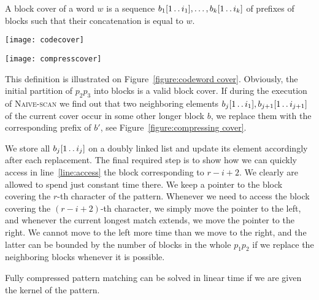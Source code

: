 \documentclass[runningheads]{llncs}
\newcommand{\twodots}{\mathinner{\ldotp\ldotp}}
\newcommand{\proc}[1]{\textnormal{\scshape#1}}
\begin{document}
\begin{definition}
A block cover of a word $w$ is a sequence $b_1[1\twodots i_1], \ldots, b_k[1\twodots i_k]$ of prefixes of blocks 
such that their concatenation is equal to $w$.
\end{definition}

\begin{figure*}
\begin{minipage}[b]{0.5\linewidth}
\centering
\texttt{[image: codecover]}
\caption{A block cover of $w$.}
\label{figure:codeword cover}
\end{minipage}
\begin{minipage}[b]{0.5\linewidth}
\centering
\texttt{[image: compresscover]}
\caption{Compressing the current block cover.}
\label{figure:compressing cover}
\end{minipage}
\end{figure*}

This definition is illustrated on Figure~\ref{figure:codeword cover}. Obviously, the initial partition of $p_2 p_3$ into blocks is a valid block cover.
If during the execution of \proc{Naive-scan} we find out that two neighboring elements $b_j[1\twodots i_1], b_{j+1}[1\twodots i_{j+1}]$ of the current cover occur in some other longer block $b$, we replace them with the corresponding prefix of $b'$, see Figure~\ref{figure:compressing cover}. 

We store all $b_j[1\twodots i_j]$ on a doubly linked list and update its element accordingly after each replacement. The final required step
is to show how we can quickly access in line~\ref{line:access} the block corresponding to $r-i+2$. We clearly are allowed to spend just constant
time there. We keep a pointer to the block covering the $r$-th character of the pattern. Whenever we need to access the block covering
the $(r-i+2)$-th character, we simply move the pointer to the left, and whenever the current longest match extends, we move the pointer to the right.
We cannot move to the left more time than we move to the right, and the latter can be bounded by the number of blocks in the whole $p_1 p_2$ if we replace the neighboring blocks whenever it is possible.



\begin{lemma}
\label{lemma:kernel acceleration}
Fully compressed pattern matching can be solved in linear time if we are given the kernel of the pattern.
\end{lemma}
\end{document}
